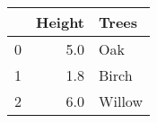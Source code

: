 \begin{tabular}{lrl}
\toprule
{} &  Height &   Trees \\
\midrule
0 &     5.0 &     Oak \\
1 &     1.8 &   Birch \\
2 &     6.0 &  Willow \\
\bottomrule
\end{tabular}